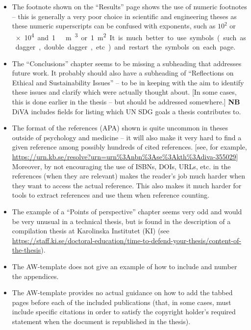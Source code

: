 \documentclass[12pt, twoside]{article}
\begin{document}
\clearpage
\begin{itemize}[resume*, label=\color{red}]
\item The footnote shown on the ``Results'' page shows the use of numeric footnotes -- this is generally a very poor choice in scientific and engineering theses as these numeric superscripts can be confused with exponents, such as $10^{2}$ or \qty{e4} and 1\ m\textsuperscript{3} or \qty{1}{\metre\squared}.  It is much better to use symbols (such as dagger, double dagger, etc.) and restart the symbols on each page.

\item The ``Conclusions'' chapter seems to be missing a subheading that addresses future work. It probably should also have a subheading of ``Reflections on Ethical and Sustainability Issues'' -- to be in keeping with the aim to identify these issues and clarify which were actually thought about. [In some cases, this is done earlier in the thesis -- but should be addressed somewhere.] \textbf{NB} DiVA includes fields for listing which UN SDG goals a thesis contributes to.

\item The format of the references (APA) shown is quite uncommon in theses outside of psychology and medicine -- it will also make it very hard to find a given reference among possibly hundreds of cited references. [see, for example,
\url{https://urn.kb.se/resolve?urn=urn%3Anbn%3Ase%3Akth%3Adiva-355029}]
Moreover, by not encouraging the use of ISBNs, DOIs, URLs, etc. in the references (when they are relevant) makes the reader's job much harder when they want to access the actual reference. This also makes it much harder for tools to extract references and use them when reference counting.

\item  The example of a ``Points of perspective'' chapter seems very odd and would be very unusual in a technical thesis, but is found in the description of a compilation thesis at Karolinska Institutet (KI) (see \url{https://staff.ki.se/doctoral-education/time-to-defend-your-thesis/content-of-the-thesis}).

\item The AW-template does not give an example of how to include and number the appendices.

\item The AW-template provides no actual guidance on how to add the tabbed pages before each of the included publications (that, in some cases, must include specific citations in order to satisfy the copyright holder's required statement when the document is republished in the thesis).
\end{itemize}
\end{document}
